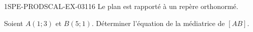 \begin{exercice}{1SPE-PRODSCAL-EX-031}{1}{6}
Le plan est rapporté à un repère orthonormé.

Soient $A(1; 3)$ et $B(5; 1)$. Déterminer l'équation de la médiatrice de $[AB]$.
\end{exercice}
